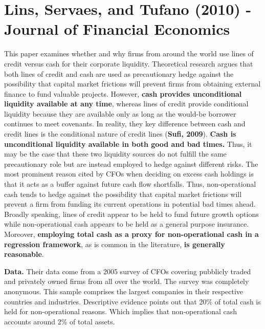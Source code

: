 \documentclass{article}
\begin{document}
{\section{Lins, Servaes, and Tufano (2010) - Journal of Financial Economics}

This paper examines whether and why firms from around the world use lines of credit versus cash for their corporate liquidity. Theoretical research argues that both lines of credit and cash are used as precautionary hedge against the possibility that capital market frictions will prevent firms from obtaining external finance to fund valuable projects. However, \textbf{cash provides unconditional liquidity available at any time}, whereas lines of credit provide conditional liquidity because they are available only as long as the would-be borrower continues to meet covenants. In reality, they key difference between cash and credit lines is the conditional nature of credit lines (\textbf{Sufi, 2009}). \textbf{Cash is unconditional liquidity available in both good and bad times.} Thus, it may be the case that these two liquidity sources do not fulfill the same precautionary role but are instead employed to hedge against different risks. The most prominent reason cited by CFOs when deciding on excess cash holdings is that it acts as a buffer against future cash flow shortfalls. Thus, non-operational cash tends to hedge against the possibility that capital market frictions will prevent a firm from funding its current operations in potential bad times ahead. Broadly speaking, lines of credit appear to be held to fund future growth options while non-operational cash appears to be held as a general purpose insurance. Moreover, \textbf{employing total cash as a proxy for non-operational cash in a regression framework}, as is common in the literature, \textbf{is generally reasonable}.

\textbf{Data.} Their data come from a 2005 survey of CFOs covering pubblicly traded and privately owned firms from all over the world. The survey was completely anonymous. This sample comprises the largest companies in their respective countries and industries. Descriptive evidence points out that 20\% of total cash is held for non-operational reasons. Which implies that non-operational cash accounts around 2\% of total assets. 

}
\end{document}
